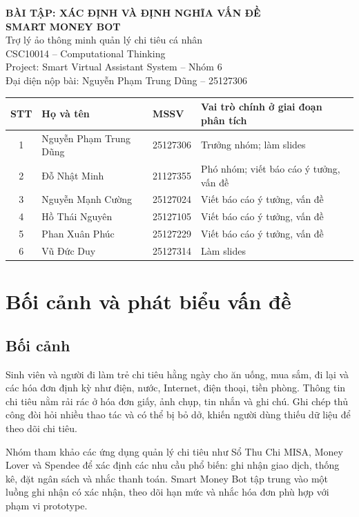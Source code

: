 \documentclass[11pt,a4paper]{article}
\newcommand{\thead}[1]{\rowcolor{tablehead}#1\\\midrule}
\begin{document}
\begin{center}
{\large\bfseries BÀI TẬP: XÁC ĐỊNH VÀ ĐỊNH NGHĨA VẤN ĐỀ}\\[7pt]
{\Large\bfseries SMART MONEY BOT}\\[4pt]
{\large Trợ lý ảo thông minh quản lý chi tiêu cá nhân}\\[9pt]
CSC10014 -- Computational Thinking\\
Project: Smart Virtual Assistant System -- Nhóm 6\\[4pt]
Đại diện nộp bài: Nguyễn Phạm Trung Dũng -- 25127306
\end{center}
\begin{tabularx}{\textwidth}{@{}c l l X@{}}
\toprule
\thead{\textbf{STT}&\textbf{Họ và tên}&\textbf{MSSV}&\textbf{Vai trò chính ở giai đoạn phân tích}}
1&Nguyễn Phạm Trung Dũng&25127306&Trưởng nhóm; làm slides\\
2&Đỗ Nhật Minh&21127355&Phó nhóm; viết báo cáo ý tưởng, vấn đề\\
3&Nguyễn Mạnh Cường&25127024&Viết báo cáo ý tưởng, vấn đề\\
4&Hồ Thái Nguyên&25127105&Viết báo cáo ý tưởng, vấn đề\\
5&Phan Xuân Phúc&25127229&Viết báo cáo ý tưởng, vấn đề\\
6&Vũ Đức Duy&25127314&Làm slides\\\bottomrule
\end{tabularx}

\section{Bối cảnh và phát biểu vấn đề}
\subsection{Bối cảnh}
Sinh viên và người đi làm trẻ chi tiêu hằng ngày cho ăn uống, mua sắm, đi lại và các hóa đơn định kỳ như điện, nước, Internet, điện thoại, tiền phòng. Thông tin chi tiêu nằm rải rác ở hóa đơn giấy, ảnh chụp, tin nhắn và ghi chú. Ghi chép thủ công đòi hỏi nhiều thao tác và có thể bị bỏ dở, khiến người dùng thiếu dữ liệu để theo dõi chi tiêu.

Nhóm tham khảo các ứng dụng quản lý chi tiêu như Sổ Thu Chi MISA, Money Lover và Spendee để xác định các nhu cầu phổ biến: ghi nhận giao dịch, thống kê, đặt ngân sách và nhắc thanh toán. Smart Money Bot tập trung vào một luồng ghi nhận có xác nhận, theo dõi hạn mức và nhắc hóa đơn phù hợp với phạm vi prototype.
\end{document}
